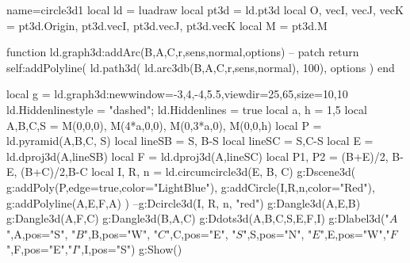\documentclass[12pt]{standalone}
\begin{document}
\begin{luadraw}{name=circle3d1}
local ld = luadraw
local pt3d = ld.pt3d
local O, vecI, vecJ, vecK = pt3d.Origin, pt3d.vecI, pt3d.vecJ, pt3d.vecK
local M = pt3d.M

function ld.graph3d:addArc(B,A,C,r,sens,normal,options) -- patch
    return self:addPolyline( ld.path3d( ld.arc3db(B,A,C,r,sens,normal), 100), options )
end

local g = ld.graph3d:new{window={-3,4,-4,5.5},viewdir={25,65},size={10,10}}
ld.Hiddenlinestyle = "dashed"; ld.Hiddenlines = true
local a, h = 1,5
local A,B,C,S = M(0,0,0), M(4*a,0,0), M(0,3*a,0), M(0,0,h)
local P = ld.pyramid({A,B,C}, S)
local lineSB = {S, B-S} 
local lineSC =  {S,C-S} 
local E = ld.dproj3d(A,lineSB)
local F = ld.dproj3d(A,lineSC)
local P1, P2 = {(B+E)/2, B-E}, {(B+C)/2,B-C}
local I, R, n   =  ld.circumcircle3d(E, B, C)
g:Dscene3d(
    g:addPoly(P,{edge=true,color="LightBlue"}),
    g:addCircle(I,R,n,{color="Red"}),
    g:addPolyline({A,E,F,A})
)
--g:Dcircle3d(I, R, n, "red")
g:Dangle3d(A,E,B)
g:Dangle3d(A,F,C)
g:Dangle3d(B,A,C)
g:Ddots3d({A,B,C,S,E,F,I})
g:Dlabel3d("$A$",A,{pos="S"}, "$B$",B,{pos="W"}, "$C$",C,{pos="E"}, "$S$",S,{pos="N"}, "$E$",E,{pos="W"},"$F$",F,{pos="E"},"$I$",I,{pos="S"})
g:Show()
\end{luadraw}
\end{document}
